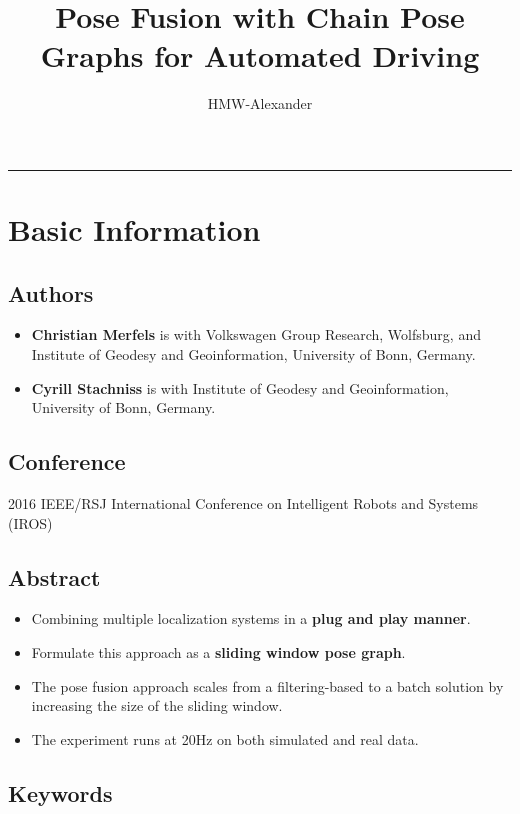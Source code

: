 \documentclass[letterpaper,11pt]{article}
\title{\textbf{Pose Fusion with Chain Pose Graphs for Automated Driving}}
\author{HMW-Alexander}
\begin{document}
	
\maketitle

\tableofcontents

\begin{center}\rule{\textwidth}{1pt}\end{center}
\section{Basic Information}

\subsection{Authors}

\begin{itemize}
	\item \textbf{Christian Merfels} is with Volkswagen Group Research, Wolfsburg, and Institute of Geodesy and Geoinformation, University of Bonn, Germany.
	\item \textbf{Cyrill Stachniss} is with Institute of Geodesy and Geoinformation, University of Bonn, Germany.
\end{itemize}

\subsection{Conference}

2016 IEEE/RSJ International Conference on Intelligent Robots and Systems (IROS)

\subsection{Abstract}

\begin{itemize}
	\item Combining multiple localization systems in a \textbf{plug and play manner}.
	\item Formulate this approach as a \textbf{sliding window pose graph}.
	\item The pose fusion approach scales from a filtering-based to a batch solution by increasing the size of the sliding window.
	\item The experiment runs at 20Hz on both simulated and real data.
\end{itemize}

\subsection{Keywords}
\end{document}

